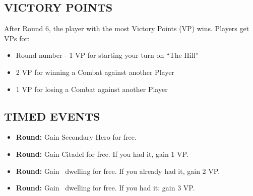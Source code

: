 \begin{multicols}{2}
\subsection*{\MakeUppercase{Victory Points}}
After Round 6, the player with the most Victory Points (VP) wins.
Players get VPs for:
\begin{itemize}
  \item Round number - 1 VP for starting your turn on ``The Hill''
  \item 2 VP for winning a Combat against another Player
  \item 1 VP for losing a Combat against another Player
\end{itemize}

\subsection*{\MakeUppercase{Timed Events}}

\begin{itemize}
  \item \textbf{ Round:} Gain Secondary Hero for free.
  \item \textbf{ Round:} Gain Citadel for free. If you had it, gain 1 VP.
  \item \textbf{ Round:} Gain \silver\ dwelling for free. If you already had it, gain 2 VP.
  \item \textbf{ Round:} Gain \golden\ dwelling for free. If you had it: gain 3 VP.
\end{itemize}


\end{multicols}
